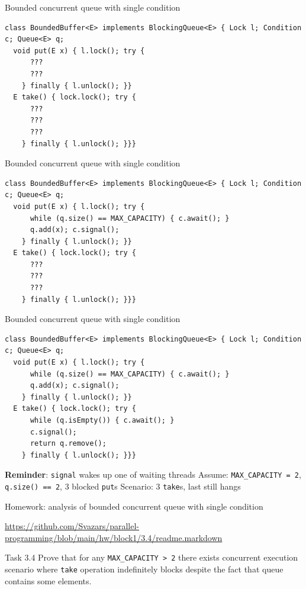 \begin{frame}{Bounded concurrent queue with single condition}

\begin{verbatim}
class BoundedBuffer<E> implements BlockingQueue<E> { Lock l; Condition c; Queue<E> q;
  void put(E x) { l.lock(); try {
      ???
      ???
    } finally { l.unlock(); }}
  E take() { lock.lock(); try {
      ???
      ???
      ???
    } finally { l.unlock(); }}}
\end{verbatim}
\end{frame}

\begin{frame}{Bounded concurrent queue with single condition}

\begin{verbatim}
class BoundedBuffer<E> implements BlockingQueue<E> { Lock l; Condition c; Queue<E> q;
  void put(E x) { l.lock(); try {
      while (q.size() == MAX_CAPACITY) { c.await(); }
      q.add(x); c.signal();
    } finally { l.unlock(); }}
  E take() { lock.lock(); try {
      ???
      ???
      ???
    } finally { l.unlock(); }}}
\end{verbatim}
\end{frame}

\begin{frame}{Bounded concurrent queue with single condition}

\begin{verbatim}
class BoundedBuffer<E> implements BlockingQueue<E> { Lock l; Condition c; Queue<E> q;
  void put(E x) { l.lock(); try {
      while (q.size() == MAX_CAPACITY) { c.await(); }
      q.add(x); c.signal();
    } finally { l.unlock(); }}
  E take() { lock.lock(); try {
      while (q.isEmpty()) { c.await(); }
      c.signal();
      return q.remove();
    } finally { l.unlock(); }}}
\end{verbatim}
\pause
\textbf{Reminder}: \texttt{signal} wakes up one of waiting threads
\pause
\newline
Assume: \texttt{MAX\_CAPACITY = 2}, \texttt{q.size() == 2}, 3 blocked \texttt{put}s
\pause
\newline
Scenario: 3 \texttt{take}s, last still hangs
\end{frame}

\begin{frame}[t,fragile]{Homework: analysis of bounded concurrent queue with single condition}

{\tiny\url{https://github.com/Svazars/parallel-programming/blob/main/hw/block1/3.4/readme.markdown}}
\begin{homeworkmail}{Task 3.4}
    Prove that for any \texttt{MAX\_CAPACITY > 2} there exists concurrent execution scenario where
    \texttt{take} operation indefinitely blocks despite the fact that queue contains some elements.
\end{homeworkmail}

\end{frame}


